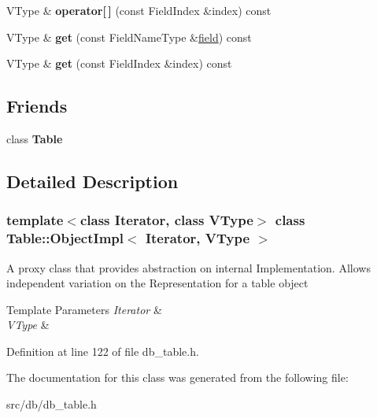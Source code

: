 \begin{DoxyCompactItemize}
\item 
\mbox{\label{class_table_1_1_object_impl_a4b9a905f7ace0a7267997ce3ea5e62af}} 
V\+Type \& {\bfseries operator\mbox{[}$\,$\mbox{]}} (const Field\+Index \&index) const
\item 
\mbox{\label{class_table_1_1_object_impl_a3e36bfbea13c01dc0a6b9f6ec04587c6}} 
V\+Type \& {\bfseries get} (const Field\+Name\+Type \&\hyperlink{class_table_ab68bc133d1d01f516d0bfb1a9c06e40f}{field}) const
\item 
\mbox{\label{class_table_1_1_object_impl_a86d26919b9bdd0f01a373ab162bf519d}} 
V\+Type \& {\bfseries get} (const Field\+Index \&index) const
\end{DoxyCompactItemize}
\subsection*{Friends}
\begin{DoxyCompactItemize}
\item 
\mbox{\label{class_table_1_1_object_impl_af888815e80064bc9fa1035c6265da86e}} 
class {\bfseries Table}
\end{DoxyCompactItemize}


\subsection{Detailed Description}
\subsubsection*{template$<$class Iterator, class V\+Type$>$\newline
class Table\+::\+Object\+Impl$<$ Iterator, V\+Type $>$}

A proxy class that provides abstraction on internal Implementation. Allows independent variation on the Representation for a table object


\begin{DoxyTemplParams}{Template Parameters}
{\em Iterator} & \\
\hline
{\em V\+Type} & \\
\hline
\end{DoxyTemplParams}


Definition at line 122 of file db\+\_\+table.\+h.



The documentation for this class was generated from the following file\+:\begin{DoxyCompactItemize}
\item 
src/db/db\+\_\+table.\+h\end{DoxyCompactItemize}
